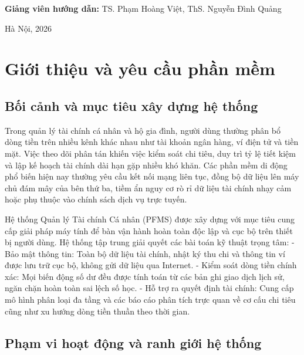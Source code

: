 \documentclass[a4paper,12pt]{report}
\begin{document}
\begin{titlepage}
\begin{center}
\vspace{0.8cm}

{\large\textbf{Giảng viên hướng dẫn:} TS. Phạm Hoàng Việt, ThS. Nguyễn Đình Quảng}

\vfill

{\large Hà Nội, 2026}

\end{center}
\end{titlepage}

\newpage
\tableofcontents
\newpage
\listoffigures
\newpage
\listoftables
\newpage

\chapter{Giới thiệu và yêu cầu phần
mềm}\label{giux1edbi-thiux1ec7u-vuxe0-yuxeau-cux1ea7u-phux1ea7n-mux1ec1m}

\section{Bối cảnh và mục tiêu xây dựng hệ
thống}\label{bux1ed1i-cux1ea3nh-vuxe0-mux1ee5c-tiuxeau-xuxe2y-dux1ef1ng-hux1ec7-thux1ed1ng}

Trong quản lý tài chính cá nhân và hộ gia đình, người dùng thường phân
bổ dòng tiền trên nhiều kênh khác nhau như tài khoản ngân hàng, ví điện
tử và tiền mặt. Việc theo dõi phân tán khiến việc kiểm soát chi tiêu,
duy trì tỷ lệ tiết kiệm và lập kế hoạch tài chính dài hạn gặp nhiều khó
khăn. Các phần mềm di động phổ biến hiện nay thường yêu cầu kết nối mạng
liên tục, đồng bộ dữ liệu lên máy chủ đám mây của bên thứ ba, tiềm ẩn
nguy cơ rò rỉ dữ liệu tài chính nhạy cảm hoặc phụ thuộc vào chính sách
dịch vụ trực tuyến.

Hệ thống Quản lý Tài chính Cá nhân (PFMS) được xây dựng với mục tiêu
cung cấp giải pháp máy tính để bàn vận hành hoàn toàn độc lập và cục bộ
trên thiết bị người dùng. Hệ thống tập trung giải quyết các bài toán kỹ
thuật trọng tâm: - Bảo mật thông tin: Toàn bộ dữ liệu tài chính, nhật ký
thu chi và thông tin ví được lưu trữ cục bộ, không gửi dữ liệu qua
Internet. - Kiểm soát dòng tiền chính xác: Mọi biến động số dư đều được
tính toán từ các bản ghi giao dịch lịch sử, ngăn chặn hoàn toàn sai lệch
số học. - Hỗ trợ ra quyết định tài chính: Cung cấp mô hình phân loại đa
tầng và các báo cáo phân tích trực quan về cơ cấu chi tiêu cũng như xu
hướng dòng tiền thuần theo thời gian.

\section{Phạm vi hoạt động và ranh giới hệ
thống}\label{phux1ea1m-vi-houx1ea1t-ux111ux1ed9ng-vuxe0-ranh-giux1edbi-hux1ec7-thux1ed1ng}
\end{document}

